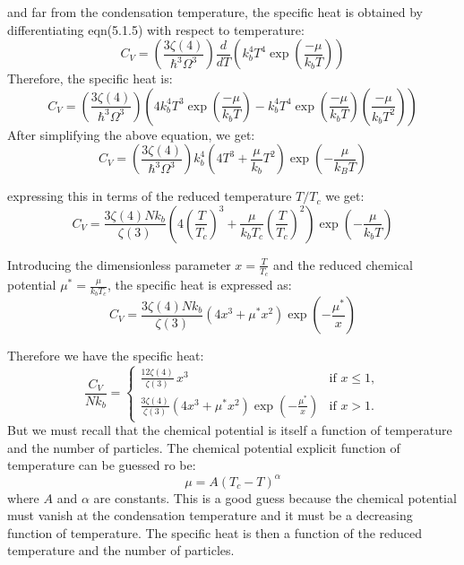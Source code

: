 \documentclass{article}
\numberwithin{equation}{section}
\numberwithin{equation}{subsection}
\begin{document}
and far from the condensation temperature, the specific heat is obtained by differentiating eqn(5.1.5) with respect to temperature:
\begin{equation}
    C_V = \left(\frac{3\zeta(4)}{\hbar^3\Omega^3}\right) \frac{d}{dT}\left(k_b^4T^4\exp\left(\frac{-\mu}{k_bT}\right)\right) 
\end{equation}
Therefore, the specific heat is:
\begin{equation}
    C_V = \left(\frac{3\zeta(4)}{\hbar^3\Omega^3}\right) \left(4k_b^4T^3\exp\left(\frac{-\mu}{k_bT}\right) - k_b^4T^4\exp\left(\frac{-\mu}{k_bT}\right)\left(\frac{-\mu}{k_bT^2}\right)\right)
\end{equation}
After simplifying the above equation, we get:
\begin{equation}
    C_V = \left(\frac{3\zeta(4)}{\hbar^3 \Omega^3}\right) k_b^4  \left( 4T^3 + \frac{\mu}{k_b} T^2 \right) \exp\left(-\frac{\mu}{k_B T}\right)
\end{equation}

expressing this in terms of the reduced temperature \( T/T_c \) we get:
\begin{equation}
    C_V = \frac{3\zeta(4) N k_b}{\zeta(3)}  \left( 4\left(\frac{T}{T_c}\right)^3 + \frac{\mu}{k_b T_c} \left(\frac{T}{T_c}\right)^2 \right)\exp\left(-\frac{\mu}{k_b T}\right)
\end{equation}

Introducing the dimensionless parameter \( x = \frac{T}{T_c} \) and the reduced chemical potential \( \mu^* = \frac{\mu}{k_b T_c} \), the specific heat is expressed as:
\begin{equation}
    C_V = \frac{3\zeta(4) N k_b}{\zeta(3)}  \left( 4x^3 + \mu^* x^2 \right)\exp\left(-\frac{\mu^*}{x}\right)
\end{equation}

Therefore we have the specific heat:
\begin{equation}
    \frac{C_V}{N k_b} = 
\begin{cases} 
\frac{12 \zeta(4) }{\zeta(3)} \, x^3 & \text{if } x \leq 1, \\[8pt]
\frac{3 \zeta(4) }{\zeta(3)} \left( 4x^3 + \mu^* x^2 \right) \exp\left(-\frac{\mu^*}{x}\right) & \text{if } x > 1.
\end{cases}
\end{equation}
But we must recall that the chemical potential is itself a function of temperature and the number of particles. The chemical potential explicit function of temperature can be guessed ro be:
\begin{equation}
    \mu = A (T_c - T)^{\alpha}
\end{equation} 
where $A$ and $\alpha$ are constants. This is a good guess because the chemical potential must vanish at the condensation temperature and it must be a decreasing function of temperature. The specific heat is then a function of the reduced temperature and the number of particles.\\
\end{document}
